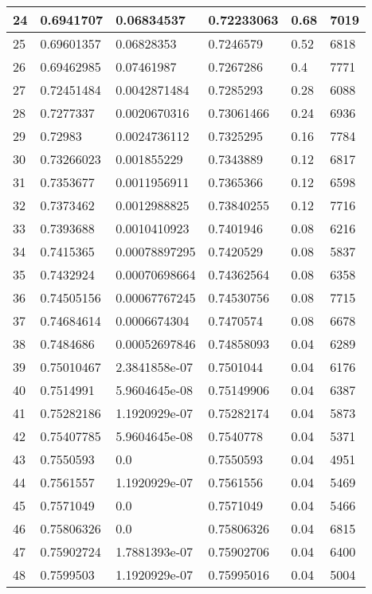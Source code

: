 \begin{longtable}{|l|l|l|l|l|l|}
24 & 0.6941707 & 0.06834537 & 0.72233063 & 0.68 & 7019 \\ \hline 
25 & 0.69601357 & 0.06828353 & 0.7246579 & 0.52 & 6818 \\ \hline 
26 & 0.69462985 & 0.07461987 & 0.7267286 & 0.4 & 7771 \\ \hline 
27 & 0.72451484 & 0.0042871484 & 0.7285293 & 0.28 & 6088 \\ \hline 
28 & 0.7277337 & 0.0020670316 & 0.73061466 & 0.24 & 6936 \\ \hline 
29 & 0.72983 & 0.0024736112 & 0.7325295 & 0.16 & 7784 \\ \hline 
30 & 0.73266023 & 0.001855229 & 0.7343889 & 0.12 & 6817 \\ \hline 
31 & 0.7353677 & 0.0011956911 & 0.7365366 & 0.12 & 6598 \\ \hline 
32 & 0.7373462 & 0.0012988825 & 0.73840255 & 0.12 & 7716 \\ \hline 
33 & 0.7393688 & 0.0010410923 & 0.7401946 & 0.08 & 6216 \\ \hline 
34 & 0.7415365 & 0.00078897295 & 0.7420529 & 0.08 & 5837 \\ \hline 
35 & 0.7432924 & 0.00070698664 & 0.74362564 & 0.08 & 6358 \\ \hline 
36 & 0.74505156 & 0.00067767245 & 0.74530756 & 0.08 & 7715 \\ \hline 
37 & 0.74684614 & 0.0006674304 & 0.7470574 & 0.08 & 6678 \\ \hline 
38 & 0.7484686 & 0.00052697846 & 0.74858093 & 0.04 & 6289 \\ \hline 
39 & 0.75010467 & 2.3841858e-07 & 0.7501044 & 0.04 & 6176 \\ \hline 
40 & 0.7514991 & 5.9604645e-08 & 0.75149906 & 0.04 & 6387 \\ \hline 
41 & 0.75282186 & 1.1920929e-07 & 0.75282174 & 0.04 & 5873 \\ \hline 
42 & 0.75407785 & 5.9604645e-08 & 0.7540778 & 0.04 & 5371 \\ \hline 
43 & 0.7550593 & 0.0 & 0.7550593 & 0.04 & 4951 \\ \hline 
44 & 0.7561557 & 1.1920929e-07 & 0.7561556 & 0.04 & 5469 \\ \hline 
45 & 0.7571049 & 0.0 & 0.7571049 & 0.04 & 5466 \\ \hline 
46 & 0.75806326 & 0.0 & 0.75806326 & 0.04 & 6815 \\ \hline 
47 & 0.75902724 & 1.7881393e-07 & 0.75902706 & 0.04 & 6400 \\ \hline 
48 & 0.7599503 & 1.1920929e-07 & 0.75995016 & 0.04 & 5004 \\ \hline 

\end{longtable}
